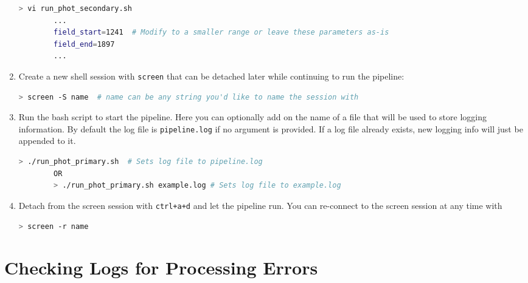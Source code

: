 \documentclass[12pt]{article}
\begin{document}
\begin{enumerate}
\begin{lstlisting}[gobble=8,language=bash,frame=single, commentstyle=\small\color{red}\ttfamily]
        > vi run_phot_secondary.sh
        ...
        field_start=1241  # Modify to a smaller range or leave these parameters as-is
        field_end=1897
        ...
    \end{lstlisting}

    \item Create a new shell session with {\tt screen} that can be detached later while continuing to run the pipeline:
    \begin{lstlisting}[gobble=8,language=bash,frame=single, commentstyle=\small\color{red}\ttfamily]
        > screen -S name  # name can be any string you'd like to name the session with
    \end{lstlisting}
    
    \item Run the bash script to start the pipeline. Here you can optionally add on the name of a file that will be used to store logging information. By default the log file is {\tt pipeline.log} if no argument is provided. If a log file already exists, new logging info will just be appended to it.
    \begin{lstlisting}[gobble=8,language=bash,frame=single, commentstyle=\small\color{red}\ttfamily]
        > ./run_phot_primary.sh  # Sets log file to pipeline.log
        OR
        > ./run_phot_primary.sh example.log # Sets log file to example.log
    \end{lstlisting}

    \item Detach from the screen session with {\tt ctrl+a+d} and let the pipeline run. You can re-connect to the screen session at any time with
    \begin{lstlisting}[gobble=8,language=bash,frame=single]
        > screen -r name
    \end{lstlisting}
\end{enumerate}

\section{Checking Logs for Processing Errors}
\end{document}
